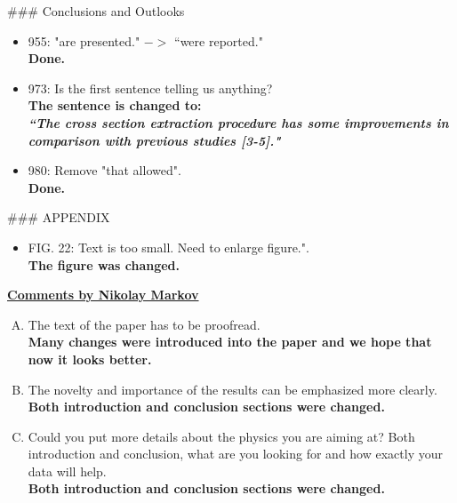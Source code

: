 \documentclass[,superscriptaddress,showpacs,amssymb,amsmath,amsfonts,linenumbers,article]{revtex4-1}
\begin{document}
\#\#\# Conclusions and Outlooks\\[0.5cm]

\begin{itemize}
\item 955: "are presented." $->$ ``were reported."\\
{\bf Done.}

\item 973: Is the first sentence telling us anything?\\
{\bf The sentence is changed to:\\
\textbf{\textit{``The cross section extraction procedure has some improvements in comparison with previous studies [3-5]."}}
}

\item 980: Remove "that allowed".\\[0.5cm]
{\bf Done.}
\end{itemize}

\#\#\# APPENDIX\\[0.5cm]

\begin{itemize}
\item FIG. 22: Text is too small. Need to enlarge figure.".\\
{\bf The figure was changed.}
\end{itemize}




\vspace{1cm}
\underline{\bf Comments by Nikolay Markov}\\[1cm]

\begin{enumerate}[A.]

\item The text of the paper has to be proofread.\\
{\bf Many changes were introduced into the paper and we hope that now it looks better.}

\item The novelty and importance of the results can be emphasized more clearly.\\
{\bf Both introduction and conclusion sections were changed.}

\item Could you put more details about the physics you are aiming at? Both introduction and conclusion, what are you looking for and how exactly your data will help.\\
{\bf Both introduction and conclusion sections were changed.}

\end{enumerate}
\end{document}
